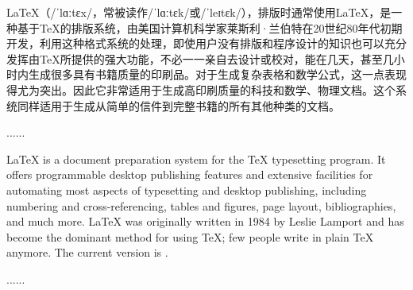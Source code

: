 
\begin{cabstract}
LaTeX（/ˈlɑːtɛx/，常被读作/ˈlɑːtɛk/或/ˈleɪtɛk/），排版时通常使用\LaTeX{}，是一种基于TeX的排版系统，由美国计算机科学家莱斯利·兰伯特在20世纪80年代初期开发，利用这种格式系统的处理，即使用户没有排版和程序设计的知识也可以充分发挥由TeX所提供的强大功能，不必一一亲自去设计或校对，能在几天，甚至几小时内生成很多具有书籍质量的印刷品。对于生成复杂表格和数学公式，这一点表现得尤为突出。因此它非常适用于生成高印刷质量的科技和数学、物理文档。这个系统同样适用于生成从简单的信件到完整书籍的所有其他种类的文档。

......
\end{cabstract}


\begin{eabstract}
\LaTeX{} is a document preparation system
for the \TeX{}   typesetting program. It offers
programmable desktop publishing features and
extensive facilities for automating most aspects
of typesetting and desktop publishing, including
numbering and cross-referencing, tables and figures,
page layout, bibliographies,   and much more.
\LaTeX{} was originally written in 1984 by Leslie
Lamport and has become the dominant method for
using \TeX; few people write in plain \TeX{} anymore.
The current version is  \LaTeXe.

......
\end{eabstract}

